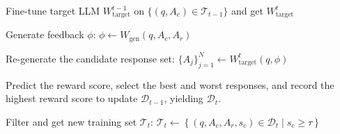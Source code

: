 \begin{algorithm}[!t]
    {  
        Fine-tune target LLM $W_\text{target}^{t-1}$ on $\{ (q, A_c) \in \mathcal{T}_{t-1}\}$ and get $W_\text{target}^t$ \label{algo:line16}

        {
        \fontsize{8pt}{10pt}\selectfont
            Generate feedback $\phi$: $\phi \gets W_\text{gen}(q, A_c, A_r)$ 
            \label{line:refine3}
            
            Re-generate the candidate response set: \newline
            $\{A_j\}_{j=1}^N \gets W_\text{target}^t(q, \phi)$
            \label{line:refine4}

            Predict the reward score, select the best and worst responses, and record the highest reward score to update $\mathcal{D}_{t-1}$, yielding $\mathcal{D}_t$. \label{algo:lin20}
        }

        Filter and get new training set $\mathcal{T}_t$: \newline
        $
        \mathcal{T}_t \gets \left\{(q, A_c, A_r, s_c) \in \mathcal{D}_t \mid s_c \geq \tau \right\}
        $
        
    }

\end{algorithm}


